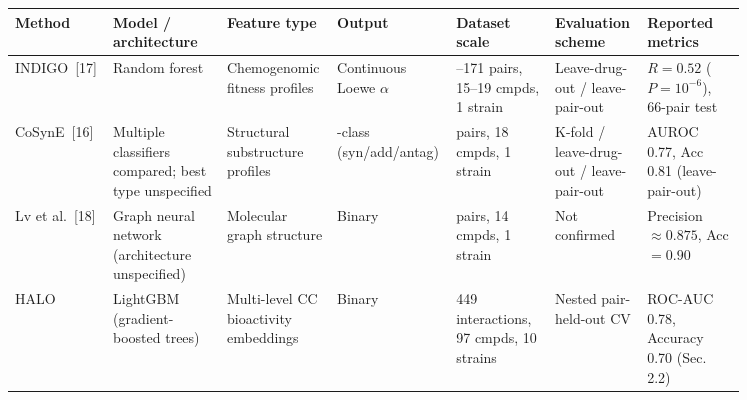 \documentclass{article}
\begin{document}
\begin{landscape}
    \centering

    \begin{minipage}{0.98\linewidth}
        \centering
        \scriptsize
        \setlength{\tabcolsep}{4pt}
        \renewcommand{\arraystretch}{1.3}


        \begin{tabular}{@{}
            >{\raggedright\arraybackslash}p{0.075\linewidth}
            >{\raggedright\arraybackslash}p{0.155\linewidth}
            >{\raggedright\arraybackslash}p{0.125\linewidth}
            >{\raggedright\arraybackslash}p{0.11\linewidth}
            >{\raggedright\arraybackslash}p{0.135\linewidth}
            >{\raggedright\arraybackslash}p{0.115\linewidth}
            >{\raggedright\arraybackslash}p{0.135\linewidth}
            @{}}
            \toprule
            Method
             & Model / architecture
             & Feature type
             & Output
             & Dataset scale
             & Evaluation scheme
             & Reported metrics                                     \\
            \midrule
            INDIGO~[17]
             & Random forest
             & Chemogenomic fitness profiles
             & Continuous Loewe $\alpha$
             & 105--171 pairs, 15--19 cmpds, 1 strain
             & Leave-drug-out / leave-pair-out
             & $R = 0.52$ ($P = 10^{-6}$), 66-pair test             \\
            CoSynE~[16]
             & Multiple classifiers compared; best type unspecified
             & Structural substructure profiles
             & 3-class (syn/add/antag)
             & 153 pairs, 18 cmpds, 1 strain
             & K-fold / leave-drug-out / leave-pair-out
             & AUROC 0.77, Acc 0.81 (leave-pair-out)                \\
            Lv et al.~[18]
             & Graph neural network (architecture unspecified)
             & Molecular graph structure
             & Binary
             & 91 pairs, 14 cmpds, 1 strain
             & Not confirmed
             & Precision $\approx 0.875$, Acc $= 0.90$              \\
            HALO
             & LightGBM (gradient-boosted trees)
             & Multi-level CC bioactivity embeddings
             & Binary
             & 2{,}449 interactions, 97 cmpds, 10 strains
             & Nested pair-held-out CV
             & ROC-AUC 0.78, Accuracy 0.70 (Sec. 2.2)               \\
            \bottomrule
        \end{tabular}
    \end{minipage}

\end{landscape}
\end{document}
